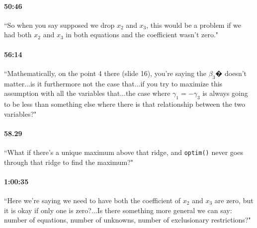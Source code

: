 \documentclass[11pt]{article}
\begin{document}
\paragraph{50:46} ``So when you say supposed we drop $x_2$ and $x_3$, this would be a problem if we had both $x_2$ and $x_3$ in both equations and the coefficient wasn't zero."

\paragraph{56:14} ``Mathematically, on the point 4 there (slide 16), you're saying the $\beta_3$� doesn't matter...is it furthermore not the case that...if you try to maximize this assumption with all the variables that...the case where $\gamma_1 = -\gamma_3$ is always going to be less than something else where there is that relationship between the two variables?"

\paragraph{58.29} ``What if there's a unique maximum above that ridge, and {\tt optim()} never goes through that ridge to find the maximum?"

\paragraph{1:00:35} ``Here we're saying we need to have both the coefficient of $x_2$ and $x_3$ are zero, but it is okay if only one is zero?...Is there something more general we can say: number of equations, number of unknowns, number of exclusionary restrictions?"
\end{document}
